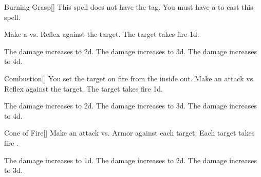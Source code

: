 \lowercase{\hypertarget{spell:Burning Grasp}{}}\label{spell:Burning Grasp}
\begin{freeability}[Rank 1]{\hypertarget{spell:Burning Grasp}{Burning Grasp}}[]
This spell does not have the  tag.
You must have a  to cast this spell.

Make a  vs. Reflex against the target.
\hit The target takes fire  \plus1d.

\rankline
{} The damage increases to  \plus2d.
 The damage increases to  \plus3d.
 The damage increases to  \plus4d.
\end{freeability}
\vspace{0.25em}



\lowercase{\hypertarget{spell:Combustion}{}}\label{spell:Combustion}
\begin{freeability}[Rank 1]{\hypertarget{spell:Combustion}{Combustion}}[]
You set the target on fire from the inside out.
Make an attack vs. Reflex against the target.
\hit The target takes fire  \plus1d.

\rankline
{} The damage increases to  \plus2d.
 The damage increases to  \plus3d.
 The damage increases to  \plus4d.
\end{freeability}
\vspace{0.25em}



\lowercase{\hypertarget{spell:Cone of Fire}{}}\label{spell:Cone of Fire}
\begin{freeability}[Rank 1]{\hypertarget{spell:Cone of Fire}{Cone of Fire}}[]
Make an attack vs. Armor against each target.
\hit Each target takes fire .

\rankline
{} The damage increases to  \plus1d.
 The damage increases to  \plus2d.
 The damage increases to  \plus3d.
\end{freeability}
\vspace{0.25em}



